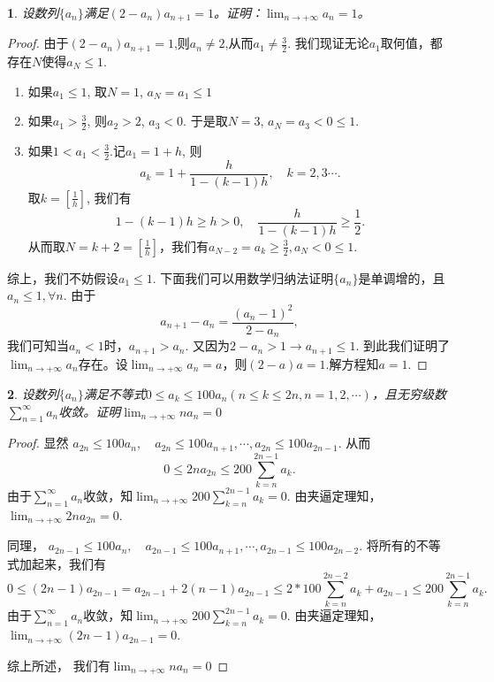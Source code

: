 \documentclass[utf8]{book}
\newtheorem{example}{}[section]             %
\begin{document}
\begin{example}
设数列$\{a_n\}$满足$(2-a_n)a_{n+1} = 1$。证明：$\displaystyle\lim_{n\to +\infty}a_{n}=1$。
\end{example}
\begin{proof}
由于$(2-a_n)a_{n+1} = 1$,则$a_n \neq 2$,从而$a_1\neq \frac{3}{2}$.
我们现证无论$a_1$取何值，都存在$N$使得$a_N \leq 1$.
\renewcommand\labelenumi{\normalfont(\theenumi)}
\begin{enumerate}
\item 如果$a_1 \leq 1$, 取$N=1$, $a_N = a_1 \leq 1$
\item 如果$a_1 > \frac{3}{2}$, 则$a_2 > 2$, $a_3 < 0$. 于是取$N=3$, $a_N = a_3 < 0 \leq 1$.
\item 如果$1< a_1 < \frac{3}{2}$.记$a_1 = 1 + h$, 则$$a_k = 1 + \frac{h}{1-(k-1)h}, \quad k = 2, 3\cdots.$$取$k=\left[\frac{1}{h}\right]$, 我们有
$$1-(k-1)h \geq h > 0, \quad \frac{h}{1-(k-1)h}\geq\frac{1}{2}.$$
从而取$N = k+2 = \left[\frac{1}{h}\right]$，我们有$a_{N-2}=a_k\geq \frac{3}{2}, a_{N}< 0\leq 1$.
\end{enumerate}
综上，我们不妨假设$a_1 \leq 1$. 下面我们可以用数学归纳法证明$\{a_n\}$是单调增的，且$a_n \leq 1,\forall n$.
由于$$a_{n+1}- a_n = \frac{(a_n - 1)^2}{2-a_n},$$
我们可知当$a_n < 1$时，$a_{n+1} > a_n$. 又因为$2-a_{n} > 1\rightarrow a_{n+1} \leq 1$. 到此我们证明了$\displaystyle\lim_{n\to +\infty}a_{n}$存在。设$\displaystyle\lim_{n\to +\infty}a_{n}=a$，则$(2-a)a=1$.解方程知$a=1$.
\end{proof}
\begin{example}
设数列$\{a_n\}$满足不等式$0\leq a_k\leq 100a_n(n\leq k\leq 2n, n=1,2,\cdots)$，且无穷级数$\displaystyle\sum_{n=1}^{\infty}a_n$收敛。证明$\displaystyle\lim_{n\to +\infty}na_n=0$
\end{example}
\begin{proof}
显然
$a_{2n} \leq 100a_n, \quad a_{2n} \leq 100a_{n+1}, \cdots, a_{2n} \leq 100a_{2n-1}.$
从而
$$0 \leq 2na_{2n} \leq 200\sum_{k=n}^{2n-1}a_k.$$
由于$\displaystyle\sum_{n=1}^{\infty}a_n$收敛，知$\displaystyle\lim_{n\to +\infty}200\sum_{k=n}^{2n-1}a_k=0$. 由夹逼定理知，$\displaystyle\lim_{n\to +\infty}2na_{2n}=0$.

同理，
$a_{2n-1} \leq 100a_n, \quad a_{2n-1}\leq 100a_{n+1}, \cdots, a_{2n-1} \leq 100 a_{2n-2}.$
将所有的不等式加起来，我们有
$$0 \leq (2n-1) a_{2n-1} = a_{2n-1} + 2(n-1)a_{2n-1} \leq 2*100\sum_{k=n}^{2n-2}a_k + a_{2n-1} \leq 200 \sum_{k=n}^{2n-1}a_k.$$
由于$\displaystyle\sum_{n=1}^{\infty}a_n$收敛，知$\displaystyle\lim_{n\to +\infty}200\sum_{k=n}^{2n-1}a_k=0$. 由夹逼定理知，$\displaystyle\lim_{n\to +\infty}(2n-1)a_{2n-1}=0$.

综上所述， 我们有$\displaystyle\lim_{n\to +\infty}na_{n}=0$
\end{proof}
\end{document}
